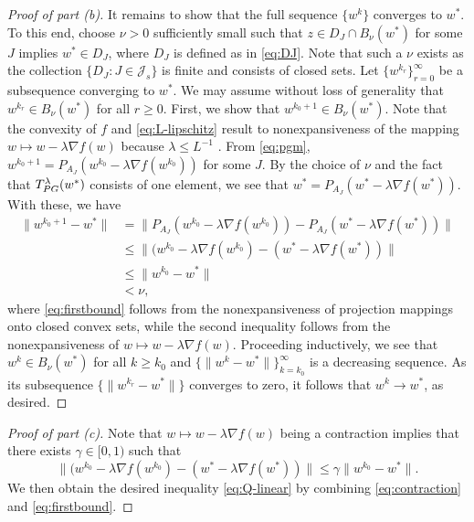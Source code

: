 \documentclass{article}
\theoremstyle{plain}
\theoremstyle{definition}
\theoremstyle{remark}
\newcommand{\J}{\mathcal{J}}
\newcommand{\Tpg}{T_{\rm PG}^{\lambda}}
\begin{document}
\begin{proof}[Proof of part (b)]
	It remains to show that the full sequence $\{w^k\}$ converges to $w^*$. To 
	this end, choose $\nu>0$ sufficiently small such that $z\in D_{J}\cap 
	B_{\nu}(w^*)$ for some $J$ implies $w^*\in D_J$, where $D_{J}$ is defined as 
	in 
	\cref{eq:DJ}. Note that such a $\nu$ exists as the collection $\{D_J : 
	J\in\J_s\}$ is finite and consists of closed sets. Let 
	$\{w^{k_r}\}_{r=0}^{\infty}$ be a subsequence converging to 
	$w^*$. We may assume without loss of generality that $w^{k_r} \in 
	B_{\nu}(w^*)$ for all $r\geq 0$. First, we show that $w^{k_0+1}\in 
	B_{\nu}(w^*)$. Note that the convexity of $f$ and 
	\cref{eq:L-lipschitz} result to 
	nonexpansiveness of the mapping $w \mapsto w-\lambda \nabla f(w)$
	because $\lambda \leq L^{-1}$
	\cite[Theorem 5.8]{Beck17}. From \cref{eq:pgm},
	$w^{k_0+1} = P_{A_{J}}\left(w^{k_0} -\lambda \nabla f(w^{k_0}) \right)$ for 
	some $J$. By the choice of $\nu$ and the fact that $\Tpg (w^*)$ consists of 
	one element, we see that $w^* = P_{A_J}(w^*-\lambda \nabla f(w^*))$. With these, 
	we have
	\begin{align}
		\nonumber
	\|w^{k_0+1} - w^*\| & = \| P_{A_{J}}\left(w^{k_0} -\lambda \nabla 
	f(w^{k_0}) \right) - P_{A_{J}} (w^* - 
	\lambda \nabla f(w^*)) \| \\
	\label{eq:firstbound}
	& \leq  \| (w^{k_0} - \lambda \nabla f(w^{k_0}) - (w^* - \lambda \nabla 
	f(w^*))\| \\
		\nonumber
	& \leq \|w^{k_0} - w^*\| \\
		\nonumber
	& < \nu ,
	\end{align}
	where \cref{eq:firstbound} follows from the nonexpansiveness of projection 
	mappings onto closed convex sets, while the second inequality follows from 
	the nonexpansiveness of $w \mapsto w-\lambda \nabla f(w)$. Proceeding 
	inductively, we see that $w^k 
	\in B_{\nu}(w^*)$ for all $k\geq k_0$ and 
	$\{\|w^k-w^*\|\}_{k=k_0}^{\infty}$ 
	is a decreasing sequence. As its subsequence $\{\|w^{k_r}-w^*\|\}$ 
	converges to zero, it follows that $w^k\to w^*$, as desired. 
\end{proof}

\begin{proof}[Proof of part (c)]
	Note that $w \mapsto w-\lambda \nabla f(w)$ being a 
	contraction implies that there exists $\gamma \in [0,1)$ such that 
	\begin{equation}
	\| (w^{k_0} - \lambda \nabla f(w^{k_0}) - (w^* - \lambda \nabla 
	f(w^*))\| \leq \gamma \|w^{k_0} - w^*\|.
	\label{eq:contraction}
	\end{equation}
	We then obtain the desired inequality \cref{eq:Q-linear} by
	combining \cref{eq:contraction} and \cref{eq:firstbound}.
\end{proof}
\end{document}
